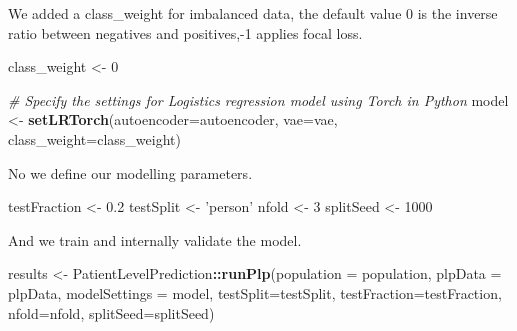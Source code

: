 \documentclass[
]{article}
\newenvironment{Shaded}{\begin{snugshade}}{\end{snugshade}}
\newcommand{\CommentTok}[1]{\textcolor[rgb]{0.56,0.35,0.01}{\textit{#1}}}
\newcommand{\DataTypeTok}[1]{\textcolor[rgb]{0.13,0.29,0.53}{#1}}
\newcommand{\DecValTok}[1]{\textcolor[rgb]{0.00,0.00,0.81}{#1}}
\newcommand{\FloatTok}[1]{\textcolor[rgb]{0.00,0.00,0.81}{#1}}
\newcommand{\KeywordTok}[1]{\textcolor[rgb]{0.13,0.29,0.53}{\textbf{#1}}}
\newcommand{\NormalTok}[1]{#1}
\newcommand{\OperatorTok}[1]{\textcolor[rgb]{0.81,0.36,0.00}{\textbf{#1}}}
\newcommand{\StringTok}[1]{\textcolor[rgb]{0.31,0.60,0.02}{#1}}
\begin{document}
We added a class\_weight for imbalanced data, the default value 0 is the
inverse ratio between negatives and positives,-1 applies focal loss.

\begin{Shaded}
\begin{Highlighting}[]
\NormalTok{class_weight <-}\StringTok{ }\DecValTok{0}
\end{Highlighting}
\end{Shaded}

\begin{Shaded}
\begin{Highlighting}[]
\CommentTok{# Specify the settings for Logistics regression model using Torch in Python}
\NormalTok{model <-}\StringTok{ }\KeywordTok{setLRTorch}\NormalTok{(}\DataTypeTok{autoencoder=}\NormalTok{autoencoder, }\DataTypeTok{vae=}\NormalTok{vae,  }\DataTypeTok{class_weight=}\NormalTok{class_weight)}
\end{Highlighting}
\end{Shaded}

No we define our modelling parameters.

\begin{Shaded}
\begin{Highlighting}[]
\NormalTok{testFraction <-}\StringTok{ }\FloatTok{0.2}
\NormalTok{testSplit <-}\StringTok{ 'person'}
\NormalTok{nfold <-}\StringTok{ }\DecValTok{3}
\NormalTok{splitSeed <-}\StringTok{ }\DecValTok{1000}
\end{Highlighting}
\end{Shaded}

And we train and internally validate the model.

\begin{Shaded}
\begin{Highlighting}[]
\NormalTok{results <-}\StringTok{ }\NormalTok{PatientLevelPrediction}\OperatorTok{::}\KeywordTok{runPlp}\NormalTok{(}\DataTypeTok{population =}\NormalTok{ population, }
                                          \DataTypeTok{plpData =}\NormalTok{ plpData, }
                                          \DataTypeTok{modelSettings =}\NormalTok{ model,}
                                          \DataTypeTok{testSplit=}\NormalTok{testSplit,}
                                          \DataTypeTok{testFraction=}\NormalTok{testFraction,}
                                          \DataTypeTok{nfold=}\NormalTok{nfold, }
                                          \DataTypeTok{splitSeed=}\NormalTok{splitSeed) }
\end{Highlighting}
\end{Shaded}
\end{document}
